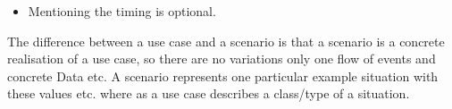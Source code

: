 \begin{parlist}
\begin{enumerate}
\begin{itemize}
					\item Mentioning the timing is optional.
				\end{itemize}			
		\end{enumerate}
	\item The difference between a use case and a scenario is that a scenario is a concrete realisation of a use case, so there are no variations only one flow of events and concrete Data etc. A scenario represents one particular example situation with these values etc. where as a use case describes a class/type of a situation. 
\end{parlist}
